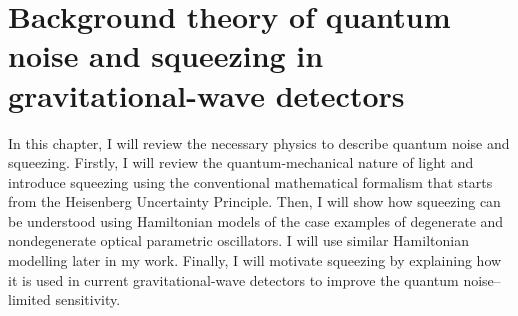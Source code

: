 \chapter{Background theory of quantum noise and squeezing in gravitational-wave detectors} %
\label{chp:background_theory}





In this chapter, I will review the necessary physics to describe quantum noise and squeezing. Firstly, I will review the quantum-mechanical nature of light and introduce squeezing using the conventional mathematical formalism that starts from the Heisenberg Uncertainty Principle. Then, I will show how squeezing can be understood using Hamiltonian models of the case examples of degenerate and nondegenerate optical parametric oscillators. I will use similar Hamiltonian modelling later in my work. %
Finally, I will motivate squeezing by explaining how it is used in current gravitational-wave detectors to improve the quantum noise--limited sensitivity. %



